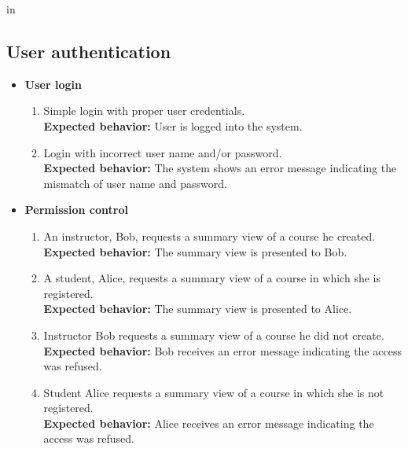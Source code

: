  in

\subsection{User authentication}
\begin{itemize}
    \item \textbf{User login} \begin{enumerate}
        \item Simple login with proper user credentials. \\
        \textbf{Expected behavior:} User is logged into the system.
        \item Login with incorrect user name and/or password. \\
        \textbf{Expected behavior:} The system shows an error message indicating
            the mismatch of user name and password.
    \end{enumerate}

    \item \textbf{Permission control} \begin{enumerate}
        \item An instructor, Bob, requests a
                summary view of a course he created. \\
        \textbf{Expected behavior:} The summary view is presented to Bob.

        \item A student, Alice, requests a summary
                view of a course in which she is registered. \\
        \textbf{Expected behavior:} The summary view is presented to Alice.

        \item Instructor Bob requests a summary view
                of a course he did not create. \\
        \textbf{Expected behavior:} Bob receives an error message indicating
            the access was refused.

        \item Student Alice requests a summary view
                of a course in which she is not registered. \\
        \textbf{Expected behavior:} Alice receives an error message
            indicating the access was refused.
    \end{enumerate}
\end{itemize}

